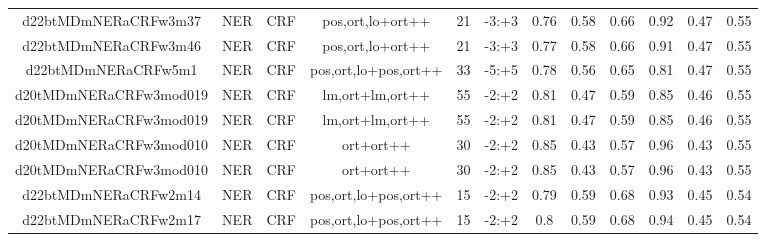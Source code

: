 \documentclass[a4paper]{article}
\begin{document}
\begin{landscape}
\begin{center}
\begin{tabular}{ |c|c|c|c|c|c|c|c|c|c|c|c|}
 	
 
 	
 		
 		\small{ d22btMDmNERaCRFw3m37 } & NER & CRF & pos,ort,lo+ort++  &  21 &  -3:+3  &  0.76 & 0.58 & 0.66  &  0.92 & 0.47 & 0.55 \\
 		

 	
 
 	
 		
 		\small{ d22btMDmNERaCRFw3m46 } & NER & CRF & pos,ort,lo+ort++  &  21 &  -3:+3  &  0.77 & 0.58 & 0.66  &  0.91 & 0.47 & 0.55 \\
 		

 	
 
 	
 		
 		\small{ d22btMDmNERaCRFw5m1 } & NER & CRF & pos,ort,lo+pos,ort++  &  33 &  -5:+5  &  0.78 & 0.56 & 0.65  &  0.81 & 0.47 & 0.55 \\
 		

 	
 
 	
 		
 		\small{ d20tMDmNERaCRFw3mod019 } & NER & CRF & lm,ort+lm,ort++  &  55 &  -2:+2  &  0.81 & 0.47 & 0.59  &  0.85 & 0.46 & 0.55 \\
 		

 	
 
 	
 		
 		\small{ d20tMDmNERaCRFw3mod019 } & NER & CRF & lm,ort+lm,ort++  &  55 &  -2:+2  &  0.81 & 0.47 & 0.59  &  0.85 & 0.46 & 0.55 \\
 		

 	
 
 	
 		
 		\small{ d20tMDmNERaCRFw3mod010 } & NER & CRF & ort+ort++  &  30 &  -2:+2  &  0.85 & 0.43 & 0.57  &  0.96 & 0.43 & 0.55 \\
 		

 	
 
 	
 		
 		\small{ d20tMDmNERaCRFw3mod010 } & NER & CRF & ort+ort++  &  30 &  -2:+2  &  0.85 & 0.43 & 0.57  &  0.96 & 0.43 & 0.55 \\
 		

 	
 
 	
 		
 		\small{ d22btMDmNERaCRFw2m14 } & NER & CRF & pos,ort,lo+pos,ort++  &  15 &  -2:+2  &  0.79 & 0.59 & 0.68  &  0.93 & 0.45 & 0.54 \\
 		

 	
 
 	
 		
 		\small{ d22btMDmNERaCRFw2m17 } & NER & CRF & pos,ort,lo+pos,ort++  &  15 &  -2:+2  &  0.8 & 0.59 & 0.68  &  0.94 & 0.45 & 0.54 \\
 		


\end{tabular}
\end{center}
\end{landscape}
\end{document}

